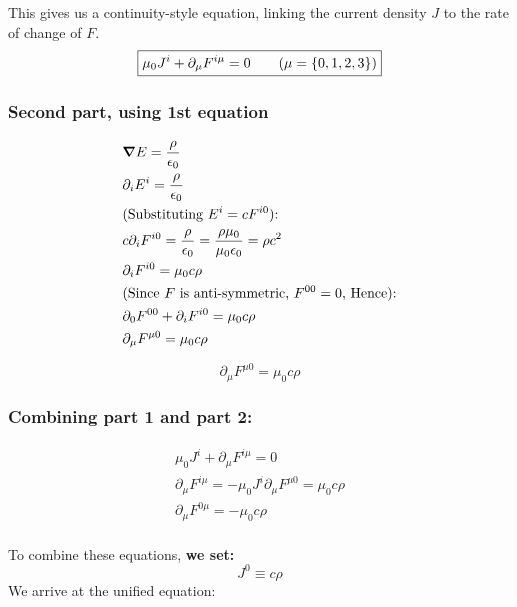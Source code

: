This gives us a continuity-style equation, linking the current density $J$ to
the rate of change of $F$.
\begin{equation}
    \boxed{ \mu_0 J^i + \partial_\mu F^{i\mu} = 0 \tag{$\mu = \{0, 1, 2, 3 \}$} }
\end{equation}


\subsubsection{Second part, using 1st equation}

\begin{align*}
    &\grad E = \frac{\rho}{\epsilon_0} \\
    &\partial_i E^i = \frac{\rho}{\epsilon_0} \\
    &\text{(Substituting $E^i = c F^{i0}$): } \\
    &c \partial_i F^{i0} = \frac{\rho}{\epsilon_0}  = \frac{\rho \mu_0}{\mu_0 \epsilon_0} = \rho c^2 \\
    &\partial_i F^{i0} = \mu_0 c \rho \\
    &\text{(Since $F$ is anti-symmetric, $F^{00} = 0$, Hence):}\\
    &\partial_0 F^{00} + \partial_i F^{i0} = \mu_0 c \rho \\
    &\partial_\mu F^{\mu 0} = \mu_0 c \rho
\end{align*}

\begin{equation}
    \boxed{ \partial_\mu F^{\mu0} = \mu_0 c \rho}
\end{equation}

\subsubsection{Combining part 1 and part 2:}


\begin{align*}
    \mu_0 J^i + \partial_\mu F^{i\mu} = 0 \tag{From $B$}  \\
    \partial_\mu F^{i\mu} = -\mu_0 J^i 
    \partial_\mu F^{\mu 0} = \mu_0 c \rho \\
    \partial_\mu F^{0 \mu} = - \mu_0 c \rho \\
\end{align*}

To combine these equations, \textbf{we set:}
\begin{equation}
    \boxed{J^0 \equiv c \rho}
\end{equation}
We arrive at the unified equation:

